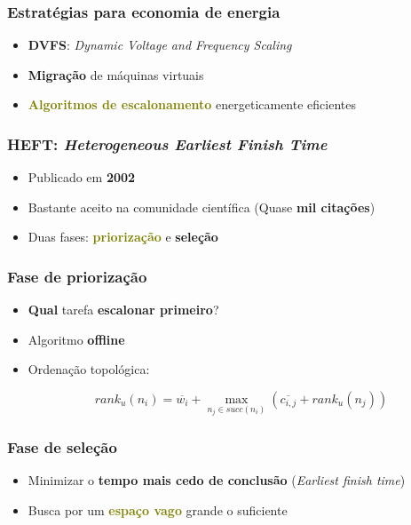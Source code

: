 \documentclass{beamer}
\newcommand{\colorize}[2]{\textbf{\textcolor{#1}{#2}}}
\begin{document}
\begin{frame}
\frametitle{Estratégias para economia de energia}
\begin{itemize}
	\item \colorize{n_red}{DVFS}: \emph{Dynamic Voltage and Frequency Scaling}
	\item \colorize{n_blue}{Migração} de máquinas virtuais
	\item \colorize{olive}{Algoritmos de escalonamento} energeticamente eficientes
\end{itemize}
\end{frame}


\begin{frame}
\frametitle{HEFT: \emph{Heterogeneous Earliest Finish Time}}
\begin{itemize}
	\item Publicado em \colorize{n_green}{2002}
	\item Bastante aceito na comunidade científica (Quase \colorize{n_violet}{mil citações})
	\item Duas fases: \colorize{olive}{priorização} e \colorize{RawSienna}{seleção}
\end{itemize}

\end{frame}

\begin{frame}
\frametitle{Fase de priorização}
\begin{itemize}
	\item \colorize{n_red}{Qual} tarefa \colorize{n_red}{escalonar primeiro}?
	\item Algoritmo \colorize{n_green}{offline}
	\item Ordenação topológica:
	
	$$ rank_u(n_i) = \overline{w_i} + \max_{n_j \in succ(n_i)} (\overline{c_{i,j}} + rank_u(n_j)) $$
\end{itemize}
\end{frame}

\begin{frame}
\frametitle{Fase de seleção}
\begin{itemize}
	\item Minimizar o \colorize{n_red}{tempo mais cedo de conclusão} (\emph{Earliest finish time})
	\item Busca por um \colorize{olive}{espaço vago} grande o suficiente
\end{itemize}
\end{frame}
\end{document}
